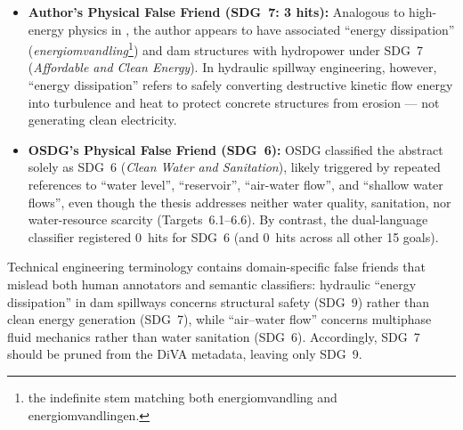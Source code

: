 \begin{casestudySection}
\begin{itemize}
    \item \textbf{Author's Physical False Friend (\gls{SDG}~7: 3 hits):} Analogous to high-energy physics in , the author appears to have associated \enquote{energy dissipation} (\emph{\foreignlanguage{swedish}{energiomvandling}}\footnote{the indefinite stem matching both \foreignlanguage{swedish}{energiomvandling} and \foreignlanguage{swedish}{energiomvandlingen}.}) and dam structures with hydropower under \gls{SDG}~7 (\emph{Affordable and Clean Energy}). In hydraulic spillway engineering, however, \enquote{energy dissipation} refers to safely converting destructive kinetic flow energy into turbulence and heat to protect concrete structures from erosion --- not generating clean electricity.
    
    \item \textbf{OSDG's Physical False Friend (\gls{SDG}~6):} OSDG classified the abstract solely as \gls{SDG}~6 (\emph{Clean Water and Sanitation}), likely triggered by repeated references to \enquote{water level}, \enquote{reservoir}, \enquote{air-water flow}, and \enquote{shallow water flows}, even though the thesis addresses neither water quality, sanitation, nor water-resource scarcity (Targets~6.1--6.6). By contrast, the dual-language classifier registered \num{0}~hits for \gls{SDG}~6 (and \num{0}~hits across all other \num{15} goals).
\end{itemize}
\end{casestudySection}

\begin{takeaway}
Technical engineering terminology contains domain-specific false friends that mislead both human annotators and semantic classifiers: hydraulic \enquote{energy dissipation} in dam spillways concerns structural safety (\gls{SDG}~9) rather than clean energy generation (\gls{SDG}~7), while \enquote{air--water flow} concerns multiphase fluid mechanics rather than water sanitation (\gls{SDG}~6). Accordingly, \gls{SDG}~7 should be pruned from the \gls{DiVA} metadata, leaving only \gls{SDG}~9.
\end{takeaway}

